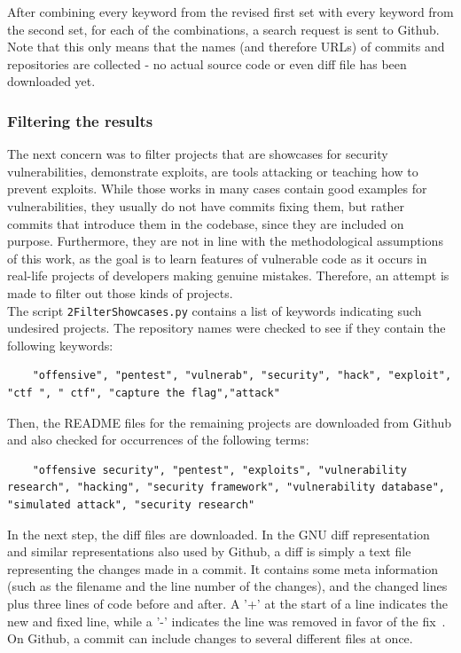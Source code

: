 \documentclass[
a4paper,
pagesize,
pdftex,
12pt,
twoside, %
BCOR=5mm, %
ngerman,
fleqn,
final,
]{scrartcl}
\begin{document}
	
	
	After combining every keyword from the revised first set with every keyword from the second set, for each of the combinations, a search request is sent to Github.
	Note that this only means that the names (and therefore URLs) of commits and repositories are collected - no actual source code or even diff file has been downloaded yet.
	
	
	
	\subsubsection{Filtering the results}
	
	The next concern was to filter projects that are showcases for security vulnerabilities, demonstrate exploits, are tools attacking or teaching how to prevent exploits. While those works in many cases contain good examples for vulnerabilities, they usually do not have commits fixing them, but rather commits that introduce them in the codebase, since they are included on purpose. Furthermore, they are not in line with the methodological assumptions of this work, as the goal is to learn features of vulnerable code as it occurs in real-life projects of developers making genuine mistakes. Therefore, an attempt is made to filter out those kinds of projects.\\
	The script \texttt{2FilterShowcases.py} contains a list of keywords indicating such undesired projects. The repository names were checked to see if they contain the following keywords:
	\begin{lstlisting}
	"offensive", "pentest", "vulnerab", "security", "hack", "exploit", "ctf ", " ctf", "capture the flag","attack"
	\end{lstlisting}
	Then, the README files for the remaining projects are downloaded from Github and also checked for occurrences of the following terms:
	\begin{lstlisting}
	"offensive security", "pentest", "exploits", "vulnerability research", "hacking", "security framework", "vulnerability database", "simulated attack", "security research"
	\end{lstlisting}
	In the next step, the diff files are downloaded. In the GNU diff representation and similar representations also used by Github, a diff is simply a text file representing the changes made in a commit. It contains some meta information (such as the filename and the line number of the changes), and the changed lines plus three lines of code before and after. A '+' at the start of a line indicates the new and fixed line, while a '-' indicates the line was removed in favor of the fix~\cite{Liu.2018}. On Github, a commit can include changes to several different files at once.\\
\end{document}
